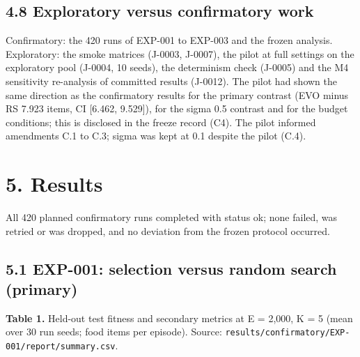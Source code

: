 \documentclass[
]{article}
\begin{document}
\subsection{4.8 Exploratory versus confirmatory
work}\label{exploratory-versus-confirmatory-work}

Confirmatory: the 420 runs of EXP-001 to EXP-003 and the frozen
analysis. Exploratory: the smoke matrices (J-0003, J-0007), the pilot at
full settings on the exploratory pool (J-0004, 10 seeds), the
determinism check (J-0005) and the M4 sensitivity re-analysis of
committed results (J-0012). The pilot had shown the same direction as
the confirmatory results for the primary contrast (EVO minus RS 7.923
items, CI {[}6.462, 9.529{]}), for the sigma 0.5 contrast and for the
budget conditions; this is disclosed in the freeze record (C4). The
pilot informed amendments C.1 to C.3; sigma was kept at 0.1 despite the
pilot (C.4).

\section{5. Results}\label{results}

All 420 planned confirmatory runs completed with status ok; none failed,
was retried or was dropped, and no deviation from the frozen protocol
occurred.

\subsection{5.1 EXP-001: selection versus random search
(primary)}\label{exp-001-selection-versus-random-search-primary}

\textbf{Table 1.} Held-out test fitness and secondary metrics at E =
2,000, K = 5 (mean over 30 run seeds; food items per episode). Source:
\texttt{results/confirmatory/EXP-001/report/summary.csv}.
\end{document}
